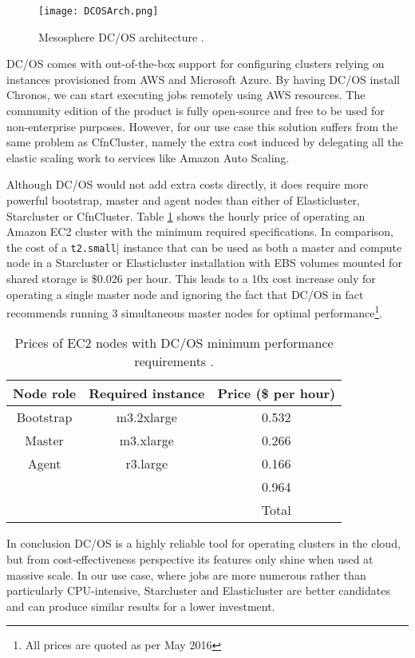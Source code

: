 \begin{figure}[h]
	\centering
		\texttt{[image: DCOSArch.png]}
	\caption{Mesosphere DC/OS architecture \cite{DCOS}.}
	\label{DCOSArch}
\end{figure}

DC/OS comes with out-of-the-box support for configuring clusters relying on instances provisioned from AWS and Microsoft Azure. By having DC/OS install Chronos, we can start executing jobs remotely using AWS resources. The community edition of the product is fully open-source and free to be used for non-enterprise purposes. However, for our use case this solution suffers from the same problem as CfnCluster, namely the extra cost induced by delegating all the elastic scaling work to services like Amazon Auto Scaling. 

Although DC/OS would not add extra costs directly, it does require more powerful bootstrap, master and agent nodes than either of Elasticluster, Starcluster or CfnCluster. Table \ref{DCOSPricing} shows the hourly price of operating an Amazon EC2 cluster with the minimum required specifications. In comparison, the cost of a \verb|t2.small|| instance that can be used as both a master and compute node in a Starcluster or Elasticluster installation with EBS volumes mounted for shared storage is \$0.026 per hour. This leads to a 10x cost increase only for operating a single master node and ignoring the fact that DC/OS in fact recommends running 3 simultaneous master nodes for optimal performance\footnote{All prices are quoted as per May 2016}.

\begin{table}[h]
\centering
\begin{tabular}{ccc}
\textbf{Node role} & \textbf{Required instance} & \textbf{Price (\$ per hour)} \\ \hline
\multicolumn{1}{|c|}{Bootstrap} & \multicolumn{1}{c|}{m3.2xlarge} & \multicolumn{1}{c|}{0.532} \\ \hline
\multicolumn{1}{|c|}{Master} & \multicolumn{1}{c|}{m3.xlarge} & \multicolumn{1}{c|}{0.266} \\ \hline
\multicolumn{1}{|c|}{Agent} & \multicolumn{1}{c|}{r3.large} & \multicolumn{1}{c|}{0.166} \\ \hline
 & \multicolumn{1}{c|}{} & \multicolumn{1}{c|}{0.964} \\ \cline{3-3} 
 &  & Total
\end{tabular}
\caption{Prices of EC2 nodes with DC/OS minimum performance requirements \cite{DCOSReq, AWSPricing}.}
\label{DCOSPricing}
\end{table}

In conclusion DC/OS is a highly reliable tool for operating clusters in the cloud, but from cost-effectiveness perspective its features only shine when used at massive scale. In our use case, where jobs are more numerous rather than particularly CPU-intensive, Starcluster and Elasticluster are better candidates and can produce similar results for a lower investment.